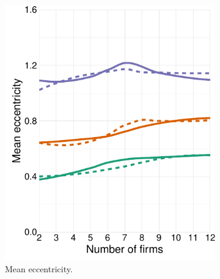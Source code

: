 \documentclass[preprint, 12pt]{elsarticle}
\begin{document}
\begin{figure}[ht!]
	\begin{subfigure}[t]{0.315\textwidth}
		\centering
		\includegraphics[width=\textwidth, trim={8mm 0 0 0}]{Graphics/figA21.pdf}
		\caption{Mean eccentricity.}
		\label{fig:asys_eccentricity_maxcovrnd}
	\end{subfigure}
	~
	\begin{subfigure}[t]{0.315\textwidth}
		\centering

\end{subfigure}
\end{figure}
\end{document}
